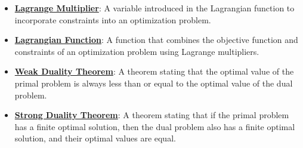 \documentclass{article}%
\begin{document}
\begin{itemize}[leftmargin=*]%
\item \href{https://www.math.purdue.edu/~yipn/421/2024-09-17-DualityGeneral.pdf#page=2}{\textbf{Lagrange Multiplier}}: A variable introduced in the Lagrangian function to incorporate constraints into an optimization problem.%
\item \href{https://www.math.purdue.edu/~yipn/421/2024-09-17-DualityGeneral.pdf#page=2}{\textbf{Lagrangian Function}}: A function that combines the objective function and constraints of an optimization problem using Lagrange multipliers.%
\item \href{https://www.math.purdue.edu/~yipn/421/2024-09-17-DualityGeneral.pdf#page=5}{\textbf{Weak Duality Theorem}}: A theorem stating that the optimal value of the primal problem is always less than or equal to the optimal value of the dual problem.%
\item \href{https://www.math.purdue.edu/~yipn/421/2024-09-17-DualityGeneral.pdf#page=17}{\textbf{Strong Duality Theorem}}: A theorem stating that if the primal problem has a finite optimal solution, then the dual problem also has a finite optimal solution, and their optimal values are equal.%
\end{itemize}%
\end{document}
